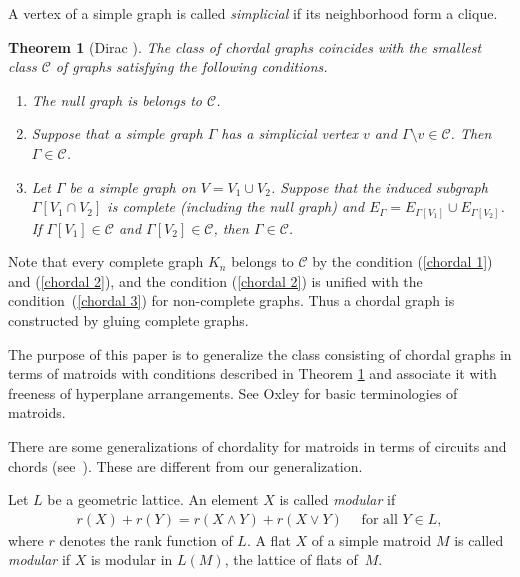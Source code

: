 \documentclass[pdftex]{sigma}
\numberwithin{equation}{section}
\newtheorem{Theorem}{Theorem}[section]
\begin{document}
A vertex of a simple graph is called \textit{simplicial} if its neighborhood form a clique.
\begin{Theorem}[Dirac {\cite[Theorems 1, 2, and 4]{dirac1961rigid-aadmsduh}}]\label{Dirac}
The class of chordal graphs coincides with the smallest class $ \mathcal{C} $ of graphs satisfying the following conditions.
\begin{enumerate}[$(i)$]\itemsep=0pt
\item\label{chordal 1} The null graph is belongs to $ \mathcal{C} $.
\item\label{chordal 2} Suppose that a simple graph $ \Gamma $ has a simplicial vertex $ v $ and $ \Gamma \setminus v \in \mathcal{C} $.
Then $ \Gamma \in \mathcal{C} $.
\item\label{chordal 3} Let $ \Gamma $ be a simple graph on $ V = V_{1} \cup V_{2} $.
Suppose that the induced subgraph $ \Gamma[V_{1}\cap V_{2}] $ is complete (including the null graph) and $ E_{\Gamma} = E_{\Gamma[V_{1}]} \cup E_{\Gamma[V_{2}]} $.
If $ \Gamma[V_{1}] \in \mathcal{C} $ and $ \Gamma[V_{2}] \in \mathcal{C} $, then $ \Gamma \in \mathcal{C} $.
\end{enumerate}
\end{Theorem}

Note that every complete graph $ K_{n} $ belongs to $ \mathcal{C} $ by the condition (\ref{chordal 1}) and (\ref{chordal 2}), and the condition (\ref{chordal 2}) is unified with the condition~(\ref{chordal 3}) for non-complete graphs.
Thus a chordal graph is constructed by gluing complete graphs.

The purpose of this paper is to generalize the class consisting of chordal graphs in terms of matroids with conditions described in Theorem \ref{Dirac} and associate it with freeness of hyperplane arrangements.
See Oxley \cite{oxley2011matroid} for basic terminologies of matroids.

There are some generalizations of chordality for matroids in terms of circuits and chords (see~\cite{probert2018chordality}).
These are different from our generalization.

Let $ L $ be a geometric lattice.
An element $ X $ is called \textit{modular} if
\begin{gather*}
r(X) + r(Y) = r(X \wedge Y) + r(X \vee Y) \quad \text{ for all } Y \in L,
\end{gather*}
where $ r $ denotes the rank function of $ L $.
A flat $ X $ of a simple matroid $ M $ is called \textit{modular} if $ X $ is modular in $ L(M) $, the lattice of flats of~$ M $.
\end{document}
